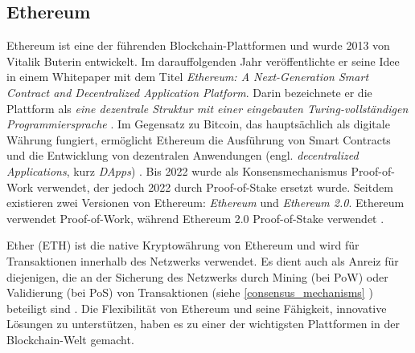 \subsection{Ethereum}
\label{sec:ethereum_basics}

Ethereum ist eine der führenden Blockchain-Plattformen und wurde 2013 von Vitalik Buterin entwickelt. Im darauffolgenden Jahr veröffentlichte er seine Idee in einem Whitepaper mit dem Titel \textit{Ethereum: A Next-Generation Smart Contract and Decentralized Application Platform}. Darin bezeichnete er die Plattform als \textit{eine dezentrale Struktur mit einer eingebauten Turing-vollständigen Programmiersprache} \parencite[S. 3]{Antonopoulos_MasteringEthereum}. Im Gegensatz zu Bitcoin, das hauptsächlich als digitale Währung fungiert, ermöglicht Ethereum die Ausführung von Smart Contracts und die Entwicklung von dezentralen Anwendungen (engl. \textit{decentralized Applications}, kurz \textit{DApps}) \Parencites[S. 720]{Sorge_BitcoinZahlungsmittelDerZukunft}[S. 1-2]{Perez_SmartContractVulnerabilities}. Bis 2022 wurde als Konsensmechanismus Proof-of-Work verwendet, der jedoch 2022 durch Proof-of-Stake ersetzt wurde. Seitdem existieren zwei Versionen von Ethereum: \textit{Ethereum} und \textit{Ethereum 2.0}. Ethereum verwendet Proof-of-Work, während Ethereum 2.0 Proof-of-Stake verwendet \Parencite{EthereumClassic_ResearcherFAQs}.

Ether (ETH) ist die native Kryptowährung von Ethereum und wird für Transaktionen innerhalb des Netzwerks verwendet. Es dient auch als Anreiz für diejenigen, die an der Sicherung des Netzwerks durch Mining (bei PoW) oder Validierung (bei PoS) von Transaktionen (siehe \ref{consensus_mechanisms} \textit{}) beteiligt sind \parencite[S. 320-321]{Antonopoulos_MasteringEthereum}. Die Flexibilität von Ethereum und seine Fähigkeit, innovative Lösungen zu unterstützen, haben es zu einer der wichtigsten Plattformen in der Blockchain-Welt gemacht.
